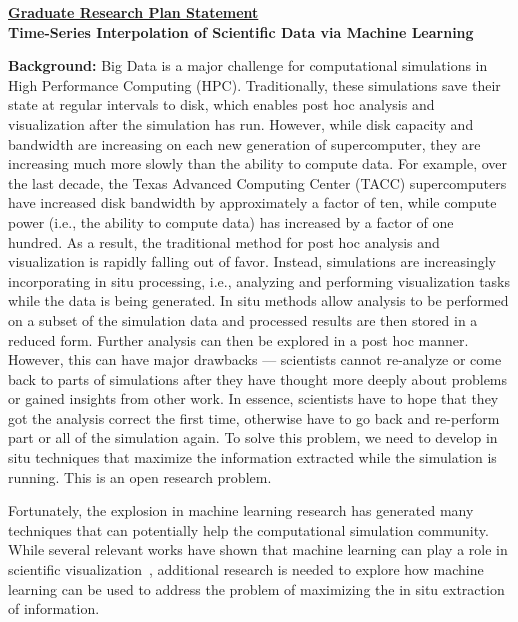 \documentclass[12pt]{article}
\begin{document}
\begin{center}
\underline{\bf Graduate Research Plan Statement}\\
{\bf Time-Series Interpolation of Scientific Data via Machine Learning} \\
\end{center}


\textbf{Background:}
%
Big Data is a major challenge for computational simulations 
in High Performance Computing (HPC).
%
Traditionally, these simulations save their state at
regular intervals to disk, which enables post hoc analysis
and visualization after the simulation has run.
%
However, while disk capacity and bandwidth are increasing on each
new generation of supercomputer, they are increasing much more slowly
than the ability to compute data.
%
For example, over the last decade, the Texas Advanced Computing Center (TACC) 
supercomputers have increased disk bandwidth by approximately a factor of ten, 
while compute power (i.e., the ability to compute data) has increased by a 
factor of one hundred.
%
%
As a result, the traditional method for post hoc analysis and visualization
is rapidly falling out of favor. Instead, simulations are increasingly
incorporating in situ processing,
i.e., analyzing and performing
visualization tasks while the data is being generated. 
%
In situ methods allow analysis to be performed on a subset of the 
simulation data and processed results are then stored in a reduced form. Further
analysis can then be explored in a post hoc manner. 
%
However, this can have major
drawbacks --- scientists cannot re-analyze or come back to parts of
simulations after they have thought more deeply about problems or gained insights
from other work. 
%
In essence, scientists have to hope that they got the analysis
correct the first time, otherwise have to go back and re-perform part or all of
the simulation again. 
%
To solve this problem, we need to develop in situ techniques that maximize the information 
extracted while the simulation is running.
%
This is an open research problem.

Fortunately, the explosion in machine learning research has generated many
techniques that can potentially help the computational simulation
community. 
%
While several relevant works have shown that machine learning can play a role in scientific
visualization~\cite{Berg,He,super}, additional research is needed to explore how
machine learning can be used to address the problem of maximizing the in situ 
extraction of information.
\end{document}
